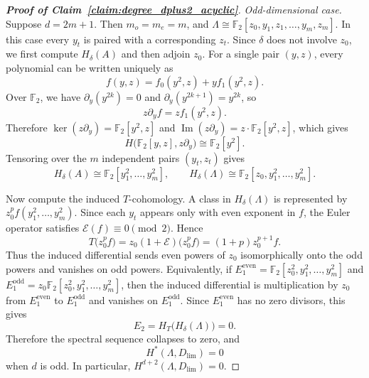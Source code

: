\documentclass[10pt,a4paper]{amsart}
\begin{document}
\begin{proof}[\textnormal{\textbf{Proof of Claim~\ref{claim:degree_dplus2_acyclic}}}]
\noindent \textit{Odd-dimensional case.}
Suppose $d=2m+1$. Then $m_o=m_e=m$, and
$\Lambda\cong \mathbb F_2[z_0,y_1,z_1,\dots,y_m,z_m]$. In this case every $y_t$ is paired with a corresponding $z_t$. Since $\delta$ does not involve $z_0$, we first compute $H_\delta(A)$ and then adjoin $z_0$. For a single pair $(y,z)$, every polynomial can be written uniquely as
\begin{equation}
f(y,z)=f_0(y^2,z)+y f_1(y^2,z).
\end{equation}
Over $\mathbb F_2$, we have $\partial_y(y^{2k})=0$ and $\partial_y(y^{2k+1})=y^{2k}$, so
\begin{equation}
z\partial_y f=z f_1(y^2,z).
\end{equation}
Therefore $\ker(z\partial_y)=\mathbb F_2[y^2,z]$ and $\operatorname{Im}(z\partial_y)=z\cdot \mathbb F_2[y^2,z]$, which gives
\begin{equation}
H\bigl(\mathbb F_2[y,z],z\partial_y\bigr)
\cong
\mathbb F_2[y^2].
\end{equation}
Tensoring over the $m$ independent pairs $(y_t,z_t)$ gives
\begin{equation}
H_\delta(A)\cong \mathbb F_2[y_1^2,\dots,y_m^2],
\qquad
H_\delta(\Lambda)\cong \mathbb F_2[z_0,y_1^2,\dots,y_m^2].
\label{eq:Hdelta_result_odd}
\end{equation}

Now compute the induced $T$-cohomology. A class in $H_\delta(\Lambda)$ is represented by $z_0^p f(y_1^2,\dots,y_m^2)$. Since each $y_t$ appears only with even exponent in $f$, the Euler operator satisfies $\mathcal E(f)\equiv 0\pmod 2$. Hence
\begin{equation}
T\bigl(z_0^p f\bigr)
=
z_0(1+\mathcal E)\bigl(z_0^p f\bigr)
=
(1+p)z_0^{p+1}f.
\end{equation}
Thus the induced differential sends even powers of $z_0$ isomorphically onto the odd powers and vanishes on odd powers. Equivalently, if
$E_1^{\mathrm{even}}=\mathbb F_2[z_0^2,y_1^2,\dots,y_m^2]$ and
$E_1^{\mathrm{odd}}=z_0\mathbb F_2[z_0^2,y_1^2,\dots,y_m^2]$, then the induced differential is multiplication by $z_0$ from $E_1^{\mathrm{even}}$ to $E_1^{\mathrm{odd}}$ and vanishes on $E_1^{\mathrm{odd}}$. Since $E_1^{\mathrm{even}}$ has no zero divisors, this gives
\begin{equation}
E_2=H_T\bigl(H_\delta(\Lambda)\bigr)=0.
\end{equation}
Therefore the spectral sequence collapses to zero, and
\begin{equation}
H^*(\Lambda,D_{\lim})=0
\end{equation}
when $d$ is odd. In particular, $H^{d+2}(\Lambda,D_{\lim})=0$.


\end{proof}
\end{document}
